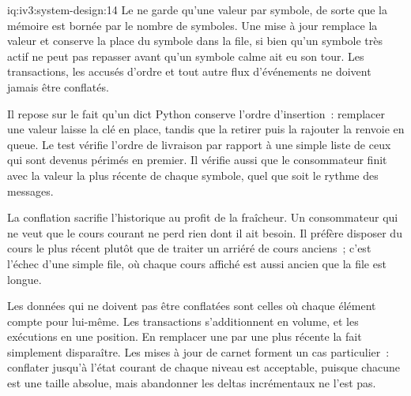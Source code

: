 \begin{solution}{iq:iv3:system-design:14}
Le  ne garde qu'une valeur par symbole, de sorte que la mémoire est bornée par le nombre de symboles. Une mise à jour remplace la valeur et conserve la place du symbole dans la file, si bien qu'un symbole très actif ne peut pas repasser avant qu'un symbole calme ait eu son tour. Les transactions, les accusés d'ordre et tout autre flux d'événements ne doivent jamais être conflatés.
\label{lst:iv3:sd:conflate}

Il repose sur le fait qu'un dict Python conserve l'ordre d'insertion~: remplacer une valeur laisse la clé en place, tandis que la retirer puis la rajouter la renvoie en queue. Le test vérifie l'ordre de livraison par rapport à une simple liste de ceux qui sont devenus périmés en premier. Il vérifie aussi que le consommateur finit avec la valeur la plus récente de chaque symbole, quel que soit le rythme des messages.

La conflation sacrifie l'historique au profit de la fraîcheur. Un consommateur qui ne veut que le cours courant ne perd rien dont il ait besoin. Il préfère disposer du cours le plus récent plutôt que de traiter un arriéré de cours anciens~; c'est l'échec d'une simple file, où chaque cours affiché est aussi ancien que la file est longue.

Les données qui ne doivent pas être conflatées sont celles où chaque élément compte pour lui-même. Les transactions s'additionnent en volume, et les exécutions en une position. En remplacer une par une plus récente la fait simplement disparaître. Les mises à jour de carnet forment un cas particulier~: conflater jusqu'à l'état courant de chaque niveau est acceptable, puisque chacune est une taille absolue, mais abandonner les deltas incrémentaux ne l'est pas.

\end{solution}

